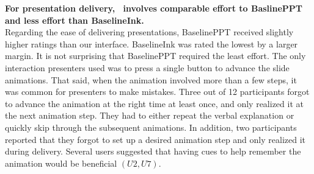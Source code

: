 \textbf{For presentation delivery, \interface\ involves comparable effort to BaslinePPT and less effort than BaselineInk.}\\
%
%
Regarding the ease of delivering presentations, BaselinePPT received slightly higher ratings than our interface. BaselineInk was rated the lowest by a larger margin. 
%
 
%
It is not surprising that BaselinePPT required the least effort. The only interaction presenters used was to press a single button to advance the slide animations. That said, when the animation involved more than a few steps, it was common for presenters to make mistakes. Three out of 12 participants forgot to advance the animation at the right time at least once, and only realized it at the next animation step. They had to either repeat the verbal explanation or quickly skip through the subsequent animations. In addition, two participants reported that they forgot to set up a desired animation step and only realized it during delivery. Several users suggested that having cues to help remember the animation would be beneficial $(U2, U7)$.

